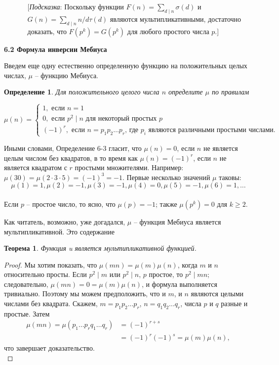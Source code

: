 \documentclass[11pt]{article}
\newtheorem{theorem}{Теорема}
\newtheorem{definition}{Определение}
\begin{document}
\begin{enumerate}
\begin{enumerate}
			[{\itshape Подсказка}: Поскольку функции $F(n)=\sum _{d\mid n}\sigma(d)$ и $G(n)=\sum _{d\mid n}n/d \tau(d) $ являются мультипликативными, достаточно доказать, что $F(p^{k})=G(p^{k})$ для любого простого числа $p$.]\\[5mm]
		\end{enumerate}
	\end{enumerate}
	
	\begin{flushleft}
		\LARGE {\textsf {\textbf {6.2 Формула инверсии Мебиуса}}}
	\end{flushleft}
	Введем еще одну естественно определенную функцию на положительных целых числах, $\mu $ -- функцию Мебиуса.
	
	\begin{definition}
		\label{Определение 1}
		Для положительного целого числа $n$ определите $\mu $ по правилам
	\end{definition}
	\[
	\mu(n) =
	\begin{cases}
	1,  \text{ если $n=1$} \\
	0,  \text{ если $p^{2}\mid n$ для некоторый простых $p$}\\
	(-1)^{r},  \text{ если $n=p_{1}p_{2}\ldots p_{r}$, где $p_{i}$ являются различными простыми числами.}
	\end{cases}
	\]
	
	Иными словами, Определение 6-3 гласит, что $\mu(n)=0$, если $n$ не является целым числом без квадратов, в то время как $\mu(n)=(-1)^{r}$, если $n$ не является квадратом с $r$ простыми множителями. Например: $\mu(30)=\mu(2\cdot3\cdot5)=(-1)^{3}=-1$. Первые несколько значений $\mu$ таковы:\\[1mm] \[\mu(1)=1,\mu(2)=-1,\mu(3)=-1,\mu(4)=0,\mu(5)=-1,\mu(6)=1,\ldots\]\\[1mm]
	Если $p$ -- простое число, то ясно, что $\mu(p) = - 1$; также $\mu(p^{k}) = 0$ для $k \ge 2$.
	
	Как читатель, возможно, уже догадался, $\mu$ -- функция Мебиуса является
	мультипликативной. Это содержание\\
	
	\begin{theorem}
		\label{Теорема 1}
		Функция u является мультипликативной функцией.
	\end{theorem}
	
	\begin{proof}
		Мы хотим показать, что $\mu(mn)=\mu(m)\mu(n)$, когда $m$ и $n$ относительно просты. Если $p^{2}\mid m$ или $p^{2}\mid n$, $p$ простое, то $p^{2}\mid mn$; следовательно,
		$\mu(mn)=0=\mu(m)\mu(n) $, и формула выполняется тривиально. Поэтому мы можем предположить, что и $m$, и $n$ являются целыми числами без квадрата. Скажем, $m = p_{1}p_{2}\ldots p_{r}$, $n = q_{1}q_{2}\ldots q_{r}$, числа $p$ и $q$ разные и простые. Затем 
		\begin{align*}
		\mu(mn)=\mu(p_{1}\ldots p_{r}q_{1}\ldots q_{r})&=(-1)^{r+s}\\
		&=(-1)^{r}(-1)^{s}=\mu(m)\mu(n),
		\end{align*}
		что завершает доказательство.\\
	\end{proof}
	
\end{document}

